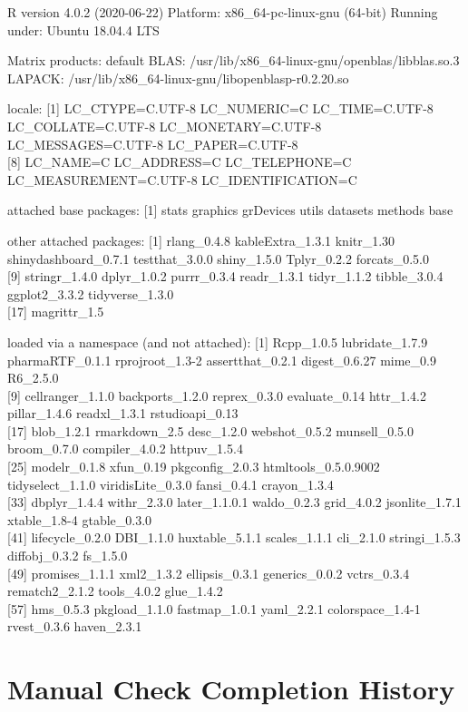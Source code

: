 \documentclass[
]{article}
\begin{document}
R version 4.0.2 (2020-06-22) Platform: x86\_64-pc-linux-gnu (64-bit)
Running under: Ubuntu 18.04.4 LTS

Matrix products: default BLAS:
/usr/lib/x86\_64-linux-gnu/openblas/libblas.so.3 LAPACK:
/usr/lib/x86\_64-linux-gnu/libopenblasp-r0.2.20.so

locale: {[}1{]} LC\_CTYPE=C.UTF-8 LC\_NUMERIC=C LC\_TIME=C.UTF-8
LC\_COLLATE=C.UTF-8 LC\_MONETARY=C.UTF-8 LC\_MESSAGES=C.UTF-8
LC\_PAPER=C.UTF-8\\
{[}8{]} LC\_NAME=C LC\_ADDRESS=C LC\_TELEPHONE=C LC\_MEASUREMENT=C.UTF-8
LC\_IDENTIFICATION=C

attached base packages: {[}1{]} stats graphics grDevices utils datasets
methods base

other attached packages: {[}1{]} rlang\_0.4.8 kableExtra\_1.3.1
knitr\_1.30 shinydashboard\_0.7.1 testthat\_3.0.0 shiny\_1.5.0
Tplyr\_0.2.2 forcats\_0.5.0\\
{[}9{]} stringr\_1.4.0 dplyr\_1.0.2 purrr\_0.3.4 readr\_1.3.1
tidyr\_1.1.2 tibble\_3.0.4 ggplot2\_3.3.2 tidyverse\_1.3.0\\
{[}17{]} magrittr\_1.5

loaded via a namespace (and not attached): {[}1{]} Rcpp\_1.0.5
lubridate\_1.7.9 pharmaRTF\_0.1.1 rprojroot\_1.3-2 assertthat\_0.2.1
digest\_0.6.27 mime\_0.9 R6\_2.5.0\\
{[}9{]} cellranger\_1.1.0 backports\_1.2.0 reprex\_0.3.0 evaluate\_0.14
httr\_1.4.2 pillar\_1.4.6 readxl\_1.3.1 rstudioapi\_0.13\\
{[}17{]} blob\_1.2.1 rmarkdown\_2.5 desc\_1.2.0 webshot\_0.5.2
munsell\_0.5.0 broom\_0.7.0 compiler\_4.0.2 httpuv\_1.5.4\\
{[}25{]} modelr\_0.1.8 xfun\_0.19 pkgconfig\_2.0.3 htmltools\_0.5.0.9002
tidyselect\_1.1.0 viridisLite\_0.3.0 fansi\_0.4.1 crayon\_1.3.4\\
{[}33{]} dbplyr\_1.4.4 withr\_2.3.0 later\_1.1.0.1 waldo\_0.2.3
grid\_4.0.2 jsonlite\_1.7.1 xtable\_1.8-4 gtable\_0.3.0\\
{[}41{]} lifecycle\_0.2.0 DBI\_1.1.0 huxtable\_5.1.1 scales\_1.1.1
cli\_2.1.0 stringi\_1.5.3 diffobj\_0.3.2 fs\_1.5.0\\
{[}49{]} promises\_1.1.1 xml2\_1.3.2 ellipsis\_0.3.1 generics\_0.0.2
vctrs\_0.3.4 rematch2\_2.1.2 tools\_4.0.2 glue\_1.4.2\\
{[}57{]} hms\_0.5.3 pkgload\_1.1.0 fastmap\_1.0.1 yaml\_2.2.1
colorspace\_1.4-1 rvest\_0.3.6 haven\_2.3.1

\hypertarget{manual-check-completion-history}{%
\section{Manual Check Completion
History}\label{manual-check-completion-history}}
\end{document}
